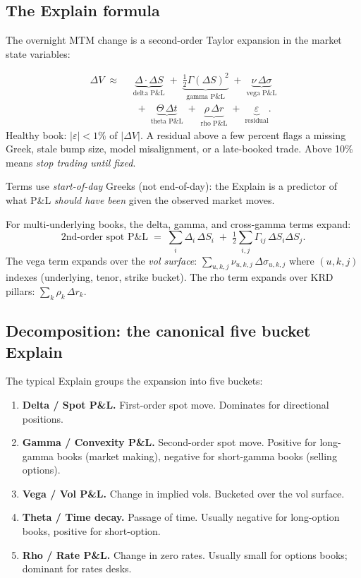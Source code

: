\subsection{The Explain formula}

The overnight MTM change is a second-order Taylor expansion in the
market state variables:

\begin{keyfactbox}
\begin{align*}
  \Delta V
  \;\approx\;\;
  & \underbrace{\Delta \cdot \Delta S}_{\text{delta P\&L}}
  \;+\; \underbrace{\tfrac{1}{2}\Gamma (\Delta S)^2}_{\text{gamma P\&L}}
  \;+\; \underbrace{\nu \, \Delta \sigma}_{\text{vega P\&L}} \\
  & \;+\; \underbrace{\Theta \, \Delta t}_{\text{theta P\&L}}
  \;+\; \underbrace{\rho \, \Delta r}_{\text{rho P\&L}}
  \;+\; \underbrace{\varepsilon}_{\text{residual}}.
\end{align*}
Healthy book: $|\varepsilon| < 1\%$ of $|\Delta V|$.  A residual
above a few percent flags a missing Greek, stale bump size, model
misalignment, or a late-booked trade.  Above 10\% means \emph{stop
trading until fixed}.
\end{keyfactbox}

Terms use \emph{start-of-day} Greeks (not end-of-day): the
Explain is a predictor of what P\&L \emph{should have been} given
the observed market moves.

For multi-underlying books, the delta, gamma, and cross-gamma terms
expand:
\[
  \text{2nd-order spot P\&L}
  \;=\; \sum_i \Delta_i \, \Delta S_i
  \;+\; \tfrac{1}{2} \sum_{i,j} \Gamma_{ij} \, \Delta S_i \Delta S_j.
\]
The vega term expands over the \emph{vol surface}: $\sum_{u,k,j}
\nu_{u,k,j} \, \Delta \sigma_{u,k,j}$ where $(u,k,j)$ indexes
(underlying, tenor, strike bucket).  The rho term expands over KRD
pillars: $\sum_k \rho_k \, \Delta r_k$.

\subsection{Decomposition: the canonical five bucket Explain}

The typical Explain groups the expansion into five buckets:

\begin{enumerate}
  \item \textbf{Delta / Spot P\&L.}  First-order spot move.
    Dominates for directional positions.
  \item \textbf{Gamma / Convexity P\&L.}  Second-order spot move.
    Positive for long-gamma books (market making), negative for
    short-gamma books (selling options).
  \item \textbf{Vega / Vol P\&L.}  Change in implied vols.
    Bucketed over the vol surface.
  \item \textbf{Theta / Time decay.}  Passage of time.  Usually
    negative for long-option books, positive for short-option.
  \item \textbf{Rho / Rate P\&L.}  Change in zero rates.  Usually
    small for options books; dominant for rates desks.
\end{enumerate}

